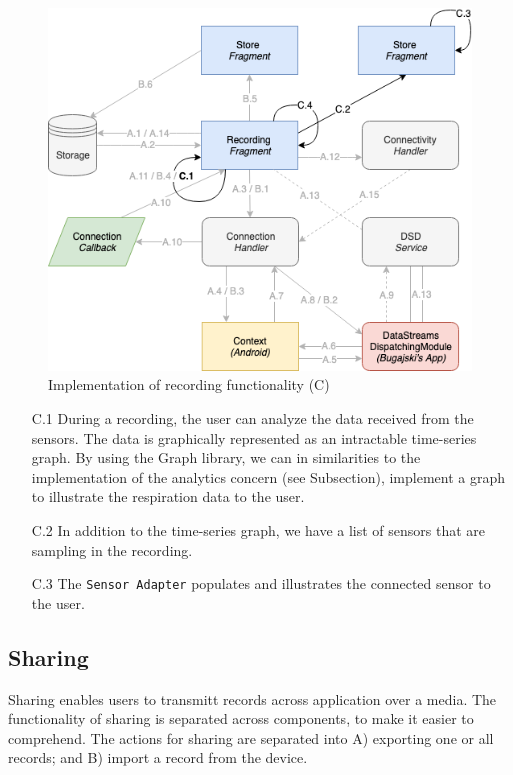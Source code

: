 \begin{figure}
    \centering
    \includegraphics[scale=0.6]{images/Recording_ImpC.png}
    \caption{Implementation of recording functionality (C)}
    \label{fig:impl_recordingC}
\end{figure}

\begin{itemize}
    \item[C.1] During a recording, the user can analyze the data received from the sensors. The data is graphically represented as an intractable time-series graph. By using the Graph library, we can in similarities to the implementation of the analytics concern (see Subsection), implement a graph to illustrate the respiration data to the user.
    \item[C.2] In addition to the time-series graph, we have a list of sensors that are sampling in the recording. 
    \item[C.3] The \verb|Sensor Adapter| populates and illustrates the connected sensor to the user.
\end{itemize}


\subsection{Sharing}

Sharing enables users to transmitt records across application over a media. The functionality of sharing is separated across components, to make it easier to comprehend. The actions for sharing are separated into A) exporting one or all records; and B) import a record from the device. 

